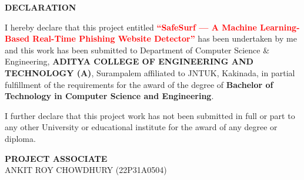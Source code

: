 \begin{center}
{\bfseries\fontsize{16}{18}\selectfont DECLARATION}
\end{center}

\vspace{0.5cm}
\noindent
I hereby declare that this project entitled
\textbf{\textcolor{red}{``SafeSurf — A Machine Learning-Based Real-Time Phishing Website Detector''}}
has been undertaken by me and this work has been submitted to Department of Computer Science \& Engineering,
\textbf{ADITYA \newline COLLEGE OF ENGINEERING AND TECHNOLOGY (A)}, Surampalem affiliated to JNTUK, Kakinada,
in partial fulfillment of the requirements for the award of the degree of
\textbf{Bachelor of Technology in Computer Science and Engineering}.

\vspace{0.5cm}

\noindent
I further declare that this project work has not been submitted in full or part to any other University
or educational institute for the award of any degree or diploma.

\vspace{2cm}

\begin{flushright}
\textbf{PROJECT ASSOCIATE}\\[0.5cm]

ANKIT ROY CHOWDHURY (22P31A0504)
\end{flushright}
